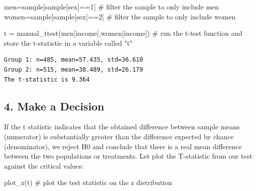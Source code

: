 \documentclass[
  letterpaper,
  DIV=11,
  numbers=noendperiod]{scrreprt}
\newenvironment{Shaded}{\begin{snugshade}}{\end{snugshade}}
\newcommand{\CommentTok}[1]{\textcolor[rgb]{0.37,0.37,0.37}{#1}}
\newcommand{\DecValTok}[1]{\textcolor[rgb]{0.68,0.00,0.00}{#1}}
\newcommand{\NormalTok}[1]{\textcolor[rgb]{0.00,0.23,0.31}{#1}}
\newcommand{\OperatorTok}[1]{\textcolor[rgb]{0.37,0.37,0.37}{#1}}
\newcommand{\StringTok}[1]{\textcolor[rgb]{0.13,0.47,0.30}{#1}}
\begin{document}
\begin{Shaded}
\begin{Highlighting}[]
\NormalTok{men}\OperatorTok{=}\NormalTok{sample[sample[}\StringTok{\textquotesingle{}sex\textquotesingle{}}\NormalTok{]}\OperatorTok{==}\DecValTok{1}\NormalTok{] }\CommentTok{\# filter the sample to only include men}
\NormalTok{women}\OperatorTok{=}\NormalTok{sample[sample[}\StringTok{\textquotesingle{}sex\textquotesingle{}}\NormalTok{]}\OperatorTok{==}\DecValTok{2}\NormalTok{] }\CommentTok{\# filter the sample to only include women}

\NormalTok{t }\OperatorTok{=}\NormalTok{ manual\_ttest(men[}\StringTok{\textquotesingle{}income\textquotesingle{}}\NormalTok{],women[}\StringTok{\textquotesingle{}income\textquotesingle{}}\NormalTok{]) }\CommentTok{\# run the t{-}test function and store the t{-}statistic in a variable called "t"}
\end{Highlighting}
\end{Shaded}

\begin{verbatim}
Group 1: n=485, mean=57.435, std=36.610
Group 2: n=515, mean=38.489, std=26.179
The t-statistic is 9.364
\end{verbatim}

\hypertarget{make-a-decision}{%
\subsection{4. Make a Decision}\label{make-a-decision}}

If the t statistic indicates that the obtained difference between sample
means (numerator) is substantially greater than the difference expected
by chance (denominator), we reject H0 and conclude that there is a real
mean difference between the two populations or treatments. Let plot the
T-statistic from our test against the critical values:

\begin{Shaded}
\begin{Highlighting}[]
\NormalTok{plot\_z(t) }\CommentTok{\# plot the test statistic on the z distribution}
\end{Highlighting}
\end{Shaded}
\end{document}
